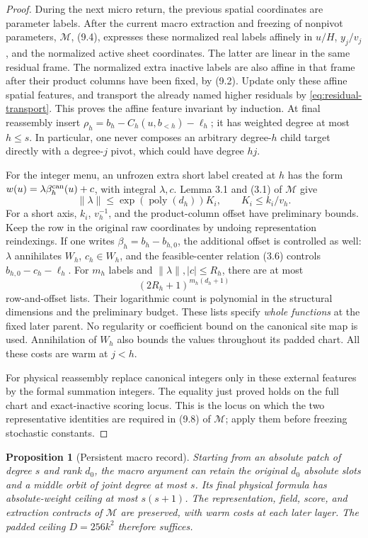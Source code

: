 \documentclass[11pt,a4paper]{article}
\newtheorem{proposition}[theorem]{Proposition}
\theoremstyle{definition}
\newcommand{\M}{\mathcal M}
\newcommand{\poly}{\operatorname{poly}}
\begin{document}
\begin{proof}
During the next micro return, the previous spatial coordinates are
parameter labels. After the current macro extraction and freezing of
nonpivot parameters, \(\M\), (9.4), expresses these normalized real
labels affinely in \(u/H\), \(y_j/v_j\), and the normalized active
sheet coordinates. The latter are linear in the same residual frame.
The normalized extra inactive labels are also affine in that frame
after their product columns have been fixed, by (9.2). Update only
these affine spatial features, and transport the already named higher
residuals by \eqref{eq:residual-transport}. This proves the affine
feature invariant by induction. At final reassembly insert
\(\rho_h=b_h-C_h(u,b_{<h})-\ell_h\); it has weighted degree at most
\(h\le s\). In particular, one never composes an arbitrary degree-\(h\)
child target directly with a degree-\(j\) pivot, which could have
degree \(hj\).

For the integer menu, an unfrozen extra short label created at \(h\)
has the form \(w(u)=\lambda\beta_h^{\rm can}(u)+c\), with integral
\(\lambda,c\). Lemma 3.1 and (3.1) of \(\M\) give
\[
 \|\lambda\|\le \exp(\poly(d_h))K_i,
 \qquad K_i\le k_i/v_h.
\]
For a short axis, \(k_i\), \(v_h^{-1}\), and the product-column
offset have preliminary bounds. Keep the row in the original raw
coordinates by undoing representation reindexings. If one writes
\(\beta_h=b_h-b_{h,0}\), the additional offset is controlled as well:
\(\lambda\) annihilates \(W_h\), \(c_h\in W_h\), and the
feasible-center relation (3.6) controls \(b_{h,0}-c_h-\ell_h\).
For \(m_h\) labels and \(\|\lambda\|,|c|\le R_h\), there are at most
\[
 (2R_h+1)^{m_h(d_h+1)}
\]
row-and-offset lists. Their logarithmic count is polynomial in the
structural dimensions and the preliminary budget. These lists specify
\emph{whole functions} at the fixed later parent. No regularity or
coefficient bound on the canonical site map is used. Annihilation of
\(W_h\) also bounds the values throughout its padded chart. All these
costs are warm at \(j<h\).

For physical reassembly replace canonical integers only in these
external features by the formal summation integers. The equality just
proved holds on the full chart and exact-inactive scoring locus. This
is the locus on which the two representative identities are required
in (9.8) of \(\M\); apply them before freezing stochastic constants.
\end{proof}

\begin{proposition}[Persistent macro record]\label{prop:macro}
Starting from an absolute patch of degree \(s\) and rank \(d_0\), the
macro argument can retain the original \(d_0\) absolute slots and a
middle orbit of joint degree at most \(s\). Its final physical formula
has absolute-weight ceiling at most \(s(s+1)\). The representation,
field, score, and extraction contracts of \(\M\) are preserved, with
warm costs at each later layer. The padded ceiling \(D=256k^2\)
therefore suffices.
\end{proposition}
\end{document}
